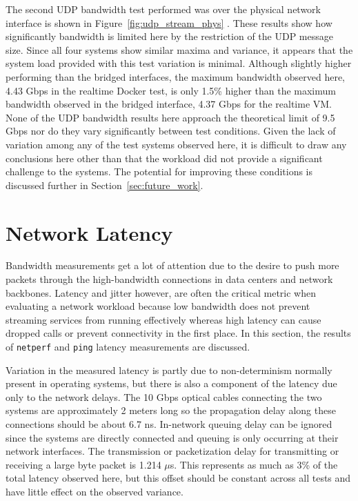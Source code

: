 The second UDP bandwidth test performed was over the physical network interface is shown in Figure~\ref{fig:udp_stream_phys} .  
These results show how significantly bandwidth is limited here by the restriction of the UDP message size.
Since all four systems show similar maxima and variance, it appears that the system load provided with this test variation is minimal.
Although slightly higher performing than the bridged interfaces, the maximum bandwidth observed here, 4.43 Gbps in the realtime Docker test, is only 1.5\% higher than the maximum bandwidth observed in the bridged interface, 4.37 Gbps for the realtime VM. 
None of the UDP bandwidth results here approach the theoretical limit of 9.5 Gbps nor do they vary significantly between test conditions.
Given the lack of variation among any of the test systems observed here, it is difficult to draw any conclusions here other than that the workload did not provide a significant challenge to the systems.
The potential for improving these conditions is discussed further in Section~\ref{sec:future_work}.



\section{Network Latency} %
\label{sec:networklatency}
Bandwidth measurements get a lot of attention due to the desire to push more packets through the high-bandwidth connections in data centers and network backbones.
Latency and jitter however, are often the critical metric when evaluating a network workload because low bandwidth does not prevent streaming services from running effectively whereas high latency can cause dropped calls or prevent connectivity in the first place.
In this section, the results of \texttt{netperf} and \texttt{ping} latency measurements are discussed.  

Variation in the measured latency is partly due to non-determinism normally present in operating systems, but there is also a component of the latency due only to the network delays.
The 10 Gbps optical cables connecting the two systems are approximately 2 meters long so the propagation delay along these connections should be about 6.7 ns.
In-network queuing delay can be ignored since the systems are directly connected and queuing is only occurring at their network interfaces.
The transmission or packetization delay for transmitting or receiving a large byte packet is 1.214 $\mu$s.
This represents as much as 3\% of the total latency observed here, but this offset should be constant across all tests and have little effect on the observed variance. 


